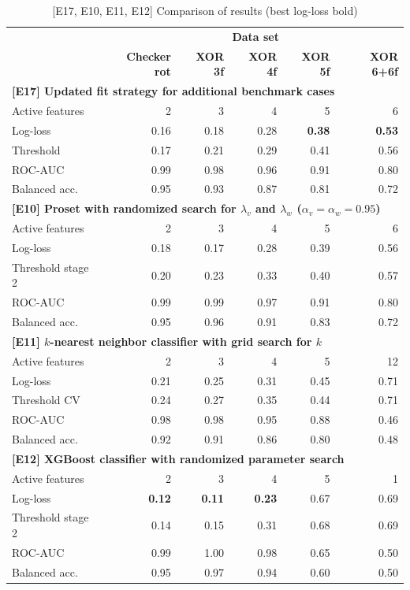 \begin{table}
\caption{[E17, E10, E11, E12] Comparison of results (best log-loss bold)}
\label{tab_e17_e10_e11_e12}
%
\begin{center}
\small
\begin{tabular}{|lrrrrr|}
\hline
&\multicolumn{5}{c|}{\textbf{\hrulefill\ Data set \hrulefill}}\\
&\textbf{Checker rot}&\textbf{XOR 3f}&\textbf{XOR 4f}&\textbf{XOR 5f}&\textbf{XOR 6+6f}\\
\multicolumn{6}{|l|}{\textbf{[E17] Updated fit strategy for additional benchmark cases}}\\
Active features&2&3&4&5&6\\
Log-loss&0.16&0.18&0.28&\textbf{0.38}&\textbf{0.53}\\
Threshold&0.17&0.21&0.29&0.41&0.56\\
ROC-AUC&0.99&0.98&0.96&0.91&0.80\\
Balanced acc.&0.95&0.93&0.87&0.81&0.72\\
\multicolumn{6}{|l|}{\textbf{[E10] Proset with randomized search for $\lambda_v$ and $\lambda_w$ ($\alpha_v=\alpha_w=0.95$)}}\\
Active features&2&3&4&5&6\\
Log-loss&0.18&0.17&0.28&0.39&0.56\\
Threshold stage 2&0.20&0.23&0.33&0.40&0.57\\
ROC-AUC&0.99&0.99&0.97&0.91&0.80\\
Balanced acc.&0.95&0.96&0.91&0.83&0.72\\
\multicolumn{6}{|l|}{\textbf{[E11] $k$-nearest neighbor classifier with grid search for $k$}}\\
Active features&2&3&4&5&12\\
Log-loss&0.21&0.25&0.31&0.45&0.71\\
Threshold CV&0.24&0.27&0.35&0.44&0.71\\
ROC-AUC&0.98&0.98&0.95&0.88&0.46\\
Balanced acc.&0.92&0.91&0.86&0.80&0.48\\
\multicolumn{6}{|l|}{\textbf{[E12] XGBoost classifier with randomized parameter search}}\\
Active features&2&3&4&5&1\\
Log-loss&\textbf{0.12}&\textbf{0.11}&\textbf{0.23}&0.67&0.69\\
Threshold stage 2&0.14&0.15&0.31&0.68&0.69\\
ROC-AUC&0.99&1.00&0.98&0.65&0.50\\
Balanced acc.&0.95&0.97&0.94&0.60&0.50\\
\hline
\end{tabular}
\end{center}
\end{table}

